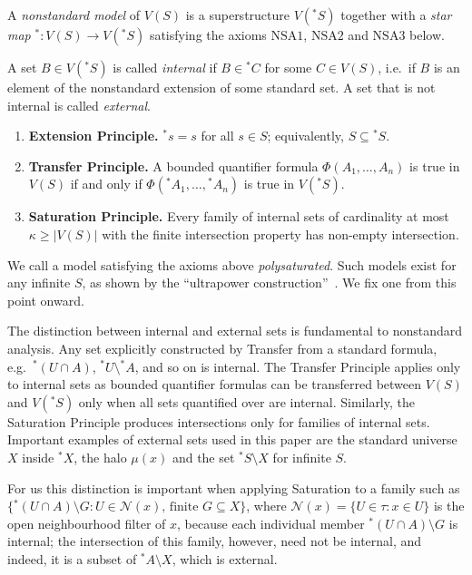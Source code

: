 \documentclass[submission,copyright,creativecommons]{eptcs}
\newcommand{\Nbd}{\mathcal{N}}
\newcommand{\str}{{{}^{*}\!}}
\begin{document}
\begin{definition}
\label{def:nsmodel}
A \emph{nonstandard model} of $V(S)$ is a superstructure $V(\str S)$ together with a \emph{star map} $\str : V(S) \to V(\str S)$ satisfying the axioms $\mathrm{NSA1}$, $\mathrm{NSA2}$ and $\mathrm{NSA3}$ below.

A set $B \in V(\str S)$ is called \emph{internal} if $B \in \str C$ for some $C \in V(S)$, i.e.\ if $B$ is an element of the nonstandard extension of some standard set. A set that is not internal is called \emph{external}.

\begin{enumerate}[label=\textup{(NSA\arabic*)}]
  \item \textbf{Extension Principle.}
    $\str s = s$ for all $s \in S$; equivalently, $S \subseteq \str S$.

  \item \textbf{Transfer Principle.}
    A bounded quantifier formula $\Phi(A_1,\ldots,A_n)$ is true in $V(S)$ if and only if $\Phi(\str A_1,\ldots,\str A_n)$ is true in $V(\str S)$.

  \item \textbf{Saturation Principle.}
    Every family of internal sets of cardinality at most $\kappa\geq |V(S)|$ with the finite intersection property has non-empty intersection.
\end{enumerate}
We call a model satisfying the axioms above 
\emph{polysaturated}.
Such models exist for any infinite $S$, as shown by the ``ultrapower construction''~\cite{SalbanyTodorov1999}. 
We fix one from this point onward.
\end{definition}


The distinction between internal and external sets is fundamental to nonstandard analysis.
Any set explicitly constructed by Transfer from a standard formula, e.g.\ $\str(U \cap A)$, $\str U \setminus \str A$, and so on is internal.
The Transfer Principle applies only to internal sets as bounded quantifier formulas can be transferred between $V(S)$ and $V(\str S)$ only when all sets quantified over are internal. 
Similarly, the Saturation Principle produces intersections only for families of internal sets. 
Important examples of external sets used in this paper are the standard universe $X$ inside $\str X$, the halo $\mu(x)$ and the set $\str S\setminus X$ for infinite $S$.

For us this distinction is important when applying Saturation to a family such as $\{\str (U \cap A) \setminus G : U \in \mathcal{N}(x),\, \text{finite } G \subseteq X\}$, where $\Nbd(x)=\{U \in \tau:x\in U\}$ is the open neighbourhood filter of $x$, because each individual member $\str (U \cap A) \setminus G$ is internal;
the intersection of this family, however, need not be internal, and indeed, it is a subset of $\str A \setminus X$, which is external. 
\end{document}
